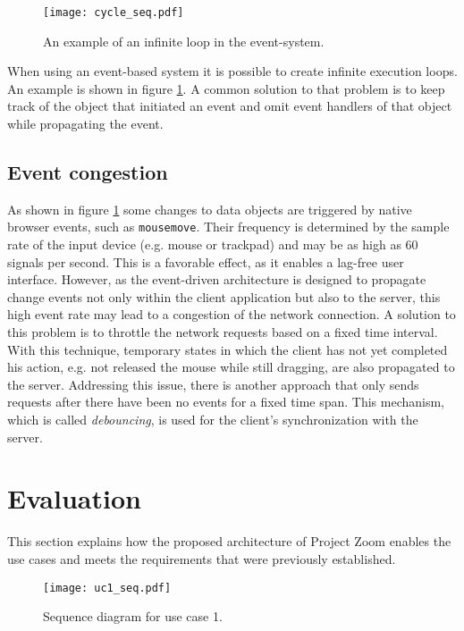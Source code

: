 \begin{figure}
\begin{center}
\texttt{[image: cycle\_seq.pdf]}
\caption{An example of an infinite loop in the event-system.}
\label{fig:eventcycle}
\end{center}
\end{figure}

When using an event-based system it is possible to create infinite execution loops. An example is shown in figure \ref{fig:eventcycle}. A common solution to that problem is to keep track of the object that initiated an event and omit event handlers of that object while propagating the event. \cite{Sommers_2009}

\section{Event congestion}
As shown in figure \ref{fig:eventcycle} some changes to data objects are triggered by native browser events, such as \texttt{mousemove}. Their frequency is determined by the sample rate of the input device (e.g. mouse or trackpad) and may be as high as 60 signals per second. This is a favorable effect, as it enables a lag-free user interface. However, as the event-driven architecture is designed to propagate change events not only within the client application but also to the server, this high event rate may lead to a congestion of the network connection. 
A solution to this problem is to throttle the network requests based on a fixed time interval. With this technique, temporary states in which the client has not yet completed his action, e.g. not released the mouse while still dragging, are also propagated to the server. Addressing this issue, there is another approach that only sends requests after there have been no events for a fixed time span. This mechanism, which is called \textit{debouncing}, is used for the client's synchronization with the server. \cite{Walsh_2012}


\chapter{Evaluation}

This section explains how the proposed architecture of Project Zoom enables the use cases and meets the requirements that were previously established.

\begin{figure}
\begin{center}
\texttt{[image: uc1\_seq.pdf]}
\caption{Sequence diagram for use case 1.}
\label{fig:evaluc1}
\end{center}
\end{figure}


